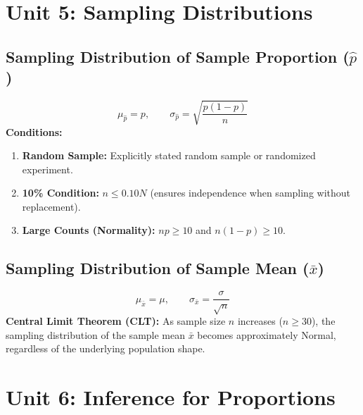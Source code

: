 \documentclass[11pt,oneside,openany]{book}
\begin{document}
\chapter{Unit 5: Sampling Distributions}

\section{Sampling Distribution of Sample Proportion ($\hat{p}$)}
\begin{equation}
  \mu_{\hat{p}} = p, \qquad \sigma_{\hat{p}} = \sqrt{\frac{p(1-p)}{n}}
\end{equation}
\textbf{Conditions:}
\begin{enumerate}[leftmargin=1.2em]
  \item \textbf{Random Sample:} Explicitly stated random sample or randomized experiment.
  \item \textbf{10\% Condition:} $n \le 0.10N$ (ensures independence when sampling without replacement).
  \item \textbf{Large Counts (Normality):} $np \ge 10$ and $n(1-p) \ge 10$.
\end{enumerate}

\section{Sampling Distribution of Sample Mean ($\bar{x}$)}
\begin{equation}
  \mu_{\bar{x}} = \mu, \qquad \sigma_{\bar{x}} = \frac{\sigma}{\sqrt{n}}
\end{equation}
\textbf{Central Limit Theorem (CLT):} As sample size $n$ increases ($n \ge 30$), the sampling distribution of the sample mean $\bar{x}$ becomes approximately Normal, regardless of the underlying population shape.

\chapter{Unit 6: Inference for Proportions}
\end{document}
